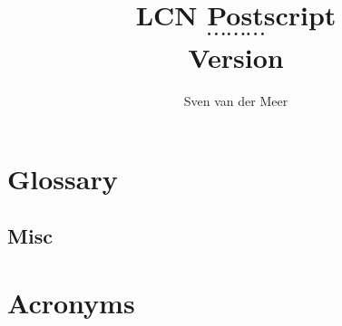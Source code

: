 \documentclass[a4paper,final,notitlepage,makeindex]{article}
\begin{document}
    \renewcommand*{\bibfont}{\citefont}
    \newcommand{\lcncite}[1]{{\citefont\cite{#1}}}

    \makeatletter
        \renewcommand{\figureautorefname}{Fig.\@gobble}
        \renewcommand{\sectionautorefname}{\S\@gobble}
        \renewcommand{\subsectionautorefname}{\S\@gobble}
        \renewcommand{\subsubsectionautorefname}{\S\@gobble}
    \makeatother

    \author{Sven van der Meer}
    \title{LCN Postscript \\ $\cdots \cdots \cdots$ \\ \small{Version }}
    \maketitle

    

    \begin{multicols}{2}
        \setcounter{tocdepth}{3}
        \tableofcontents
    \end{multicols}
    \newpage

    
    \newpage

    

    

    



    \section{Glossary}
        \subsection{Misc}
            

    

    


    


    

    \section{Acronyms}
        \begin{multicols}{2}
            \setlength{\columnseprule}{0pt}
            \footnotesize
            
        \end{multicols}

    \printbibliography[heading=bibintoc]

    \cleardoublepage
    \printindex
\end{document}
